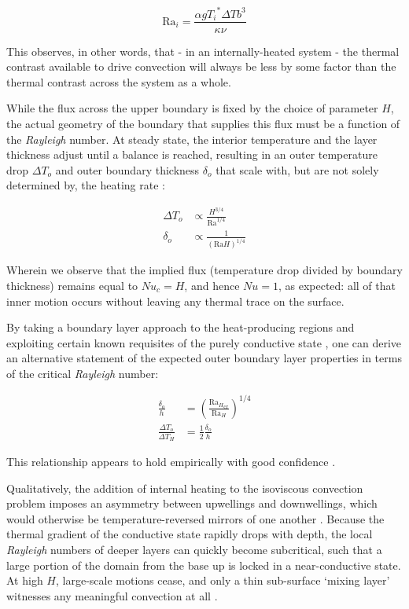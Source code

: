 \begin{equation}
{\mathrm{Ra}}_i = \frac{\alpha g {T_i}^{*} \Delta T b^3}{\kappa \nu}
\end{equation}

This observes, in other words, that - in an internally-heated system - the thermal contrast available to drive convection will always be less by some factor than the thermal contrast across the system as a whole.

While the flux across the upper boundary is fixed by the choice of parameter $H$, the actual geometry of the boundary that supplies this flux must be a function of the \textit{Rayleigh} number. At steady state, the interior temperature and the layer thickness adjust until a balance is reached, resulting in an outer temperature drop ${\Delta T}_o$ and outer boundary thickness ${\delta}_o$ that scale with, but are not solely determined by, the heating rate \cite{Schubert2001-ea}:

\begin{align*}
{\Delta T}_o &\propto \frac{H^{3/4}}{{\mathrm{Ra}}^{1/4}} \\
{\delta}_o &\propto \frac{1}{{(\mathrm{Ra}H)}^{1/4}}
\end{align*}

Wherein we observe that the implied flux (temperature drop divided by boundary thickness) remains equal to ${Nu}_c = H$, and hence $Nu=1$, as expected: all of that inner motion occurs without leaving any thermal trace on the surface.

By taking a boundary layer approach to the heat-producing regions \cite{Jaupart2010-zy} and exploiting certain known requisites of the purely conductive state \cite{Vilella2017-mg}, one can derive an alternative statement of the expected outer boundary layer properties in terms of the critical \textit{Rayleigh} number:

\begin{align*}
\frac{{\delta}_o}{h} &= {\left( \frac{{{\mathrm{Ra}}_{H}}_{\mathrm{cr}}}{{\mathrm{Ra}}_H} \right)}^{1/4} \\
\frac{{\Delta T}_o}{{\Delta T}_H} &= \frac{1}{2} \frac{{\delta}_o}{h}
\end{align*}

This relationship appears to hold empirically with good confidence \cite{Vilella2017-mg}.

Qualitatively, the addition of internal heating to the isoviscous convection problem imposes an asymmetry between upwellings and downwellings, which would otherwise be temperature-reversed mirrors of one another \cite{Weinstein1990-dd}. Because the thermal gradient of the conductive state rapidly drops with depth, the local \textit{Rayleigh} numbers of deeper layers can quickly become subcritical, such that a large portion of the domain from the base up is locked in a near-conductive state. At high $H$, large-scale motions cease, and only a thin sub-surface `mixing layer' witnesses any meaningful convection at all \cite{Parmentier1994-on}.

